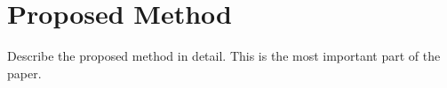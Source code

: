 \section{Proposed Method}
\label{sec:proposed-method}

Describe the proposed method in detail. This is the most important part of the paper.